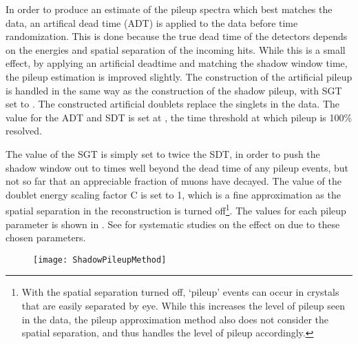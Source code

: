 In order to produce an estimate of the pileup spectra which best matches the data, an artifical dead time (ADT) is applied to the data before time randomization. This is done because the true dead time of the detectors depends on the energies and spatial separation of the incoming hits. While this is a small effect, by applying an artificial deadtime and matching the shadow window time, the pileup estimation is improved slightly. The construction of the artificial pileup is handled in the same way as the construction of the shadow pileup, with SGT set to . The constructed artificial doublets replace the singlets in the data. The value for the ADT and SDT is set at , the time threshold at which pileup is 100\% resolved. 

The value of the SGT is simply set to twice the SDT, in order to push the shadow window out to times well beyond the dead time of any pileup events, but not so far that an appreciable fraction of muons have decayed. The value of the doublet energy scaling factor C is set to 1, which is a fine approximation as the spatial separation in the reconstruction is turned off\footnote{With the spatial separation turned off, `pileup' events can occur in crystals that are easily separated by eye. While this increases the level of pileup seen in the data, the pileup approximation method also does not consider the spatial separation, and thus handles the level of pileup accordingly.}. The values for each pileup parameter is shown in . See  for systematic studies on the effect on \wa due to these chosen parameters.



\begin{figure}[]
    \centering
    \texttt{[image: ShadowPileupMethod]}
    \caption[Shadow pileup method]{}
    \label{fig:ShadowPileupMethod}
\end{figure}


